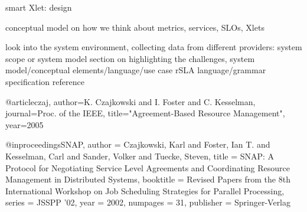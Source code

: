 smart Xlet: design 

conceptual model on how we think about metrics, services, SLOs, Xlets

look into the system environment, collecting data from different providers: system scope or system model 
section on highlighting the challenges, 
system model/conceptual elements/language/use case
rSLA language/grammar specification reference 


@article{czaj,
author={K. Czajkowski and I. Foster and C. Kesselman},
journal={Proc. of the IEEE}, 
title="{A}greement-{B}ased {R}esource {M}anagement",
year={2005}}

@inproceedings{SNAP, 
author = {Czajkowski, Karl and Foster, Ian T. and Kesselman, Carl and Sander, Volker and Tuecke, Steven},
title = {SNAP: A Protocol for Negotiating Service Level Agreements and Coordinating Resource Management in Distributed Systems},
booktitle = {Revised Papers from the 8th International Workshop on Job Scheduling Strategies for Parallel Processing},
series = {JSSPP '02},
year = {2002},
numpages = {31},
publisher = {Springer-Verlag}
}


